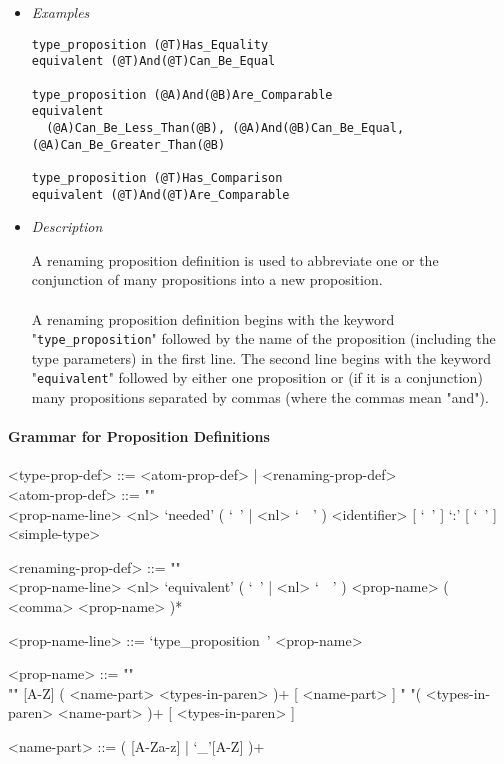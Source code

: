 \documentclass[diploma]{softlab-thesis}
\begin{document}
\begin{itemize}
\item \textit{Examples}
\begin{verbatim}
type_proposition (@T)Has_Equality
equivalent (@T)And(@T)Can_Be_Equal

type_proposition (@A)And(@B)Are_Comparable
equivalent
  (@A)Can_Be_Less_Than(@B), (@A)And(@B)Can_Be_Equal, (@A)Can_Be_Greater_Than(@B)

type_proposition (@T)Has_Comparison
equivalent (@T)And(@T)Are_Comparable
\end{verbatim}

\item \textit{Description}

A renaming proposition definition is used to abbreviate one or the conjunction
of many propositions into a new proposition.
\\\\
A renaming proposition definition begins with the keyword
"\verb|type_proposition|" followed by the name of the proposition (including
the type parameters) in the first line. The second line begins with the keyword
"\verb|equivalent|" followed by either one proposition or (if it is a
conjunction) many propositions separated by commas (where the commas
mean "and").

\end{itemize}

\paragraph{Grammar for Proposition Definitions}

\begin{grammar}
<type-prop-def> ::= <atom-prop-def> | <renaming-prop-def>
\\

<atom-prop-def> ::= ""\\
<prop-name-line> <nl> `needed' ( `\ ' | <nl> `\ \ ' )
<identifier> [ `\ ' ] `:' [ `\ ' ] <simple-type>

<renaming-prop-def> ::= ""\\
<prop-name-line> <nl>
`equivalent' ( `\ ' | <nl> `\ \ ' ) <prop-name> ( <comma> <prop-name> )*

<prop-name-line> ::= `type_proposition\ ' <prop-name>

<prop-name> ::=  ""\\""
[A-Z] ( <name-part> <types-in-paren> )+ [ <name-part> ]
\alt " "( <types-in-paren> <name-part> )+ [ <types-in-paren> ]

<name-part> ::= ( [A-Za-z] | `_'[A-Z] )+
\end{grammar}
\end{document}
